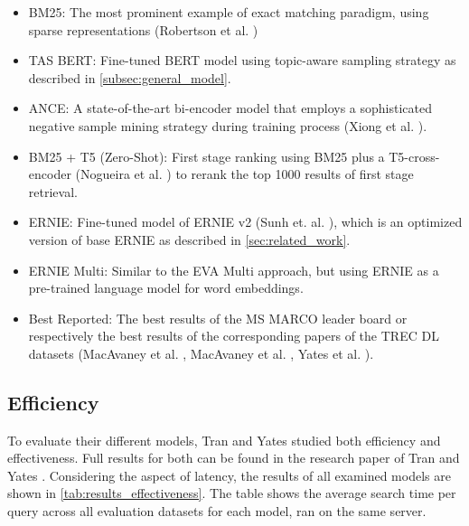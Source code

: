 \begin{itemize}
    \item BM25: The most prominent example of exact matching paradigm, using sparse representations (Robertson et al. \cite{BM25})
    \item TAS BERT: Fine-tuned BERT model using topic-aware sampling strategy as described in \autoref{subsec:general_model}.
    \item ANCE: A state-of-the-art bi-encoder model that employs a sophisticated negative sample mining strategy during training process (Xiong et al. \cite{xiong2020approximate}).
    \item BM25 + T5 (Zero-Shot): First stage ranking using BM25 plus a T5-cross-encoder (Nogueira et al. \cite{nogueira2020document}) to rerank the top 1000 results of first stage retrieval.
    \item ERNIE: Fine-tuned model of ERNIE v2 (Sunh et. al. \cite{sun2020ernie}), which is an optimized version of base ERNIE as described in \autoref{sec:related_work}.
    \item ERNIE Multi: Similar to the EVA Multi approach, but using ERNIE as a pre-trained language model for word embeddings.
    \item Best Reported: The best results of the MS MARCO leader board or respectively the best results of the corresponding papers of the TREC DL datasets (MacAvaney et al. \cite{trec_dl_2019}, MacAvaney et al. \cite{trec_dl_2020}, Yates et al. \cite{dl_hard}).
\end{itemize}

\subsection{Efficiency}\label{sec:efficiency}

To evaluate their different models, Tran and Yates studied both efficiency and effectiveness. Full results for both can be found in the research paper of Tran and Yates \cite{tran2022dense}. Considering the aspect of latency, the results of all examined models are shown in \autoref{tab:results_effectiveness}. The table shows the average search time per query across all evaluation datasets for each model, ran on the same server.

